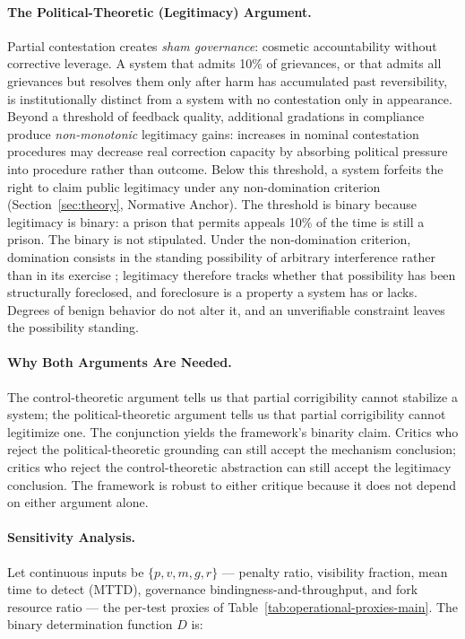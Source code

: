 \documentclass{article}
\begin{document}
\paragraph{The Political-Theoretic (Legitimacy) Argument.} Partial contestation creates \textit{sham governance}: cosmetic accountability without corrective leverage. A system that admits 10\% of grievances, or that admits all grievances but resolves them only after harm has accumulated past reversibility, is institutionally distinct from a system with no contestation only in appearance. Beyond a threshold of feedback quality, additional gradations in compliance produce \textit{non-monotonic} legitimacy gains: increases in nominal contestation procedures may decrease real correction capacity by absorbing political pressure into procedure rather than outcome. Below this threshold, a system forfeits the right to claim public legitimacy under any non-domination criterion (Section~\ref{sec:theory}, Normative Anchor). The threshold is binary because legitimacy is binary: a prison that permits appeals 10\% of the time is still a prison. The binary is not stipulated. Under the non-domination criterion, domination consists in the standing possibility of arbitrary interference rather than in its exercise \citep{pettit1997}; legitimacy therefore tracks whether that possibility has been structurally foreclosed, and foreclosure is a property a system has or lacks. Degrees of benign behavior do not alter it, and an unverifiable constraint leaves the possibility standing.

\paragraph{Why Both Arguments Are Needed.} The control-theoretic argument tells us that partial corrigibility cannot stabilize a system; the political-theoretic argument tells us that partial corrigibility cannot legitimize one. The conjunction yields the framework's binarity claim. Critics who reject the political-theoretic grounding can still accept the mechanism conclusion; critics who reject the control-theoretic abstraction can still accept the legitimacy conclusion. The framework is robust to either critique because it does not depend on either argument alone.

\paragraph{Sensitivity Analysis.} Let continuous inputs be $\{p, v, m, g, r\}$ --- penalty ratio, visibility fraction, mean time to detect (MTTD), governance bindingness-and-throughput, and fork resource ratio --- the per-test proxies of Table~\ref{tab:operational-proxies-main}. The binary determination function $D$ is:
\end{document}

